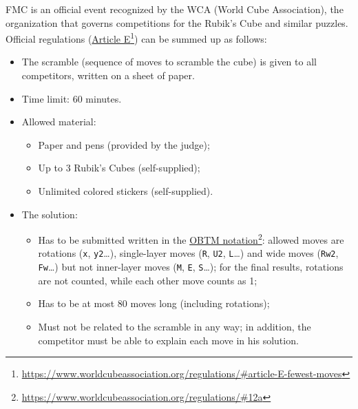 \documentclass[11pt,a4paper]{book}
\newcommand{\p}{\textquotesingle}
\newcommand{\m}{\texttt}
\begin{document}
FMC is an official event recognized by the WCA (World Cube Association), the organization that governs competitions for the Rubik's Cube and similar puzzles. Official regulations (\href{https://www.worldcubeassociation.org/regulations/\#article-E-fewest-moves}{Article E}\footnote{\url{https://www.worldcubeassociation.org/regulations/\#article-E-fewest-moves}}) can be summed up as follows:

\begin{itemize}
\item The scramble (sequence of moves to scramble the cube) is given to all competitors, written on a sheet of paper.
\item Time limit: 60 minutes.
\item Allowed material:
\begin{itemize}
\item Paper and pens (provided by the judge);
\item Up to 3 Rubik's Cubes (self-supplied);
\item Unlimited colored stickers (self-supplied).
\end{itemize}
\item The solution:
\begin{itemize}
\item Has to be submitted written in the \href{https://www.worldcubeassociation.org/regulations/\#12a}{OBTM notation}\footnote{\url{https://www.worldcubeassociation.org/regulations/\#12a}}: allowed moves are rotations (\m x, \m{y2}\dots), single-layer moves (\m{R}, \m{U2}, \m {L\p}\dots) and wide moves (\m{Rw2}, \m{Fw\p}\dots) but not inner-layer moves (\m M, \m E, \m S\dots); for the final results, rotations are not counted, while each other move counts as 1;
\item Has to be at most 80 moves long (including rotations);
\item Must not be related to the scramble in any way; in addition, the competitor must be able to explain each move in his solution.
\end{itemize}
\end{itemize}
\end{document}
